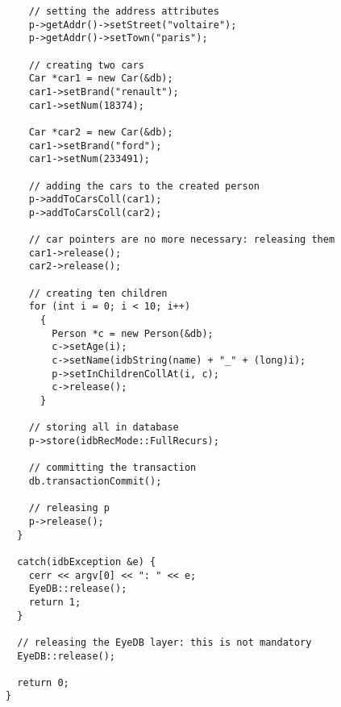 \begin{verbatim}
    // setting the address attributes
    p->getAddr()->setStreet("voltaire");
    p->getAddr()->setTown("paris");

    // creating two cars
    Car *car1 = new Car(&db);
    car1->setBrand("renault");
    car1->setNum(18374);

    Car *car2 = new Car(&db);
    car1->setBrand("ford");
    car1->setNum(233491);

    // adding the cars to the created person
    p->addToCarsColl(car1);
    p->addToCarsColl(car2);

    // car pointers are no more necessary: releasing them
    car1->release();
    car2->release();

    // creating ten children
    for (int i = 0; i < 10; i++)
      {
        Person *c = new Person(&db);
        c->setAge(i);
        c->setName(idbString(name) + "_" + (long)i);
        p->setInChildrenCollAt(i, c);
        c->release();
      }

    // storing all in database
    p->store(idbRecMode::FullRecurs);

    // committing the transaction
    db.transactionCommit();

    // releasing p
    p->release();
  }

  catch(idbException &e) {
    cerr << argv[0] << ": " << e;
    EyeDB::release();
    return 1;
  }

  // releasing the EyeDB layer: this is not mandatory
  EyeDB::release();

  return 0;
}
\end{verbatim}
\normalsize

